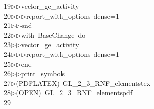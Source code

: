 \begin{tabbing}
19\>$\triangleright$\>$\triangleright$\>vector\_ge\_activity\ \\[0pt]
20\>$\triangleright$\>$\triangleright$\>$\triangleright$\>report\_with\_options\ dense=1\ \\[0pt]
21\>$\triangleright$\>$\triangleright$\>end\ \\[0pt]
22\>$\triangleright$\>$\triangleright$\>with\ BaseChange\ do\ \\[0pt]
23\>$\triangleright$\>$\triangleright$\>vector\_ge\_activity\ \\[0pt]
24\>$\triangleright$\>$\triangleright$\>$\triangleright$\>report\_with\_options\ dense=1\ \\[0pt]
25\>$\triangleright$\>$\triangleright$\>end\ \\[0pt]
26\>$\triangleright$\>$\triangleright$\>print\_symbols\\[0pt]
27\>$\triangleright$\>(PDFLATEX)\ GL\_2\_3\_RNF\_elementstex\\[0pt]
28\>$\triangleright$\>(OPEN)\ GL\_2\_3\_RNF\_elementspdf\\[0pt]
29\>\end{tabbing}
